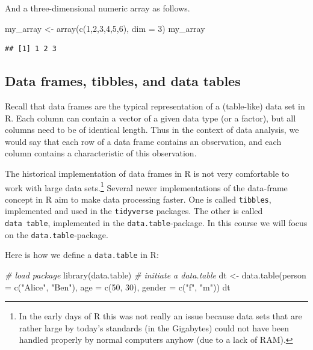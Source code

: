 \documentclass[
  12pt,
]{style/krantz}
\newenvironment{Shaded}{\begin{snugshade}}{\end{snugshade}}
\newcommand{\AttributeTok}[1]{\textcolor[rgb]{0.77,0.63,0.00}{#1}}
\newcommand{\CommentTok}[1]{\textcolor[rgb]{0.56,0.35,0.01}{\textit{#1}}}
\newcommand{\DecValTok}[1]{\textcolor[rgb]{0.00,0.00,0.81}{#1}}
\newcommand{\FunctionTok}[1]{\textcolor[rgb]{0.00,0.00,0.00}{#1}}
\newcommand{\NormalTok}[1]{#1}
\newcommand{\OtherTok}[1]{\textcolor[rgb]{0.56,0.35,0.01}{#1}}
\newcommand{\StringTok}[1]{\textcolor[rgb]{0.31,0.60,0.02}{#1}}
\begin{document}
And a three-dimensional numeric array as follows.

\begin{Shaded}
\begin{Highlighting}[]
\NormalTok{my\_array }\OtherTok{\textless{}{-}} \FunctionTok{array}\NormalTok{(}\FunctionTok{c}\NormalTok{(}\DecValTok{1}\NormalTok{,}\DecValTok{2}\NormalTok{,}\DecValTok{3}\NormalTok{,}\DecValTok{4}\NormalTok{,}\DecValTok{5}\NormalTok{,}\DecValTok{6}\NormalTok{), }\AttributeTok{dim =} \DecValTok{3}\NormalTok{)}
\NormalTok{my\_array}
\end{Highlighting}
\end{Shaded}

\begin{verbatim}
## [1] 1 2 3
\end{verbatim}

\hypertarget{data-frames-tibbles-and-data-tables}{%
\subsection{Data frames, tibbles, and data tables}\label{data-frames-tibbles-and-data-tables}}

Recall that data frames are the typical representation of a (table-like) data set in R. Each column can contain a vector of a given data type (or a factor), but all columns need to be of identical length. Thus in the context of data analysis, we would say that each row of a data frame contains an observation, and each column contains a characteristic of this observation.

The historical implementation of data frames in R is not very comfortable to work with large data sets.\footnote{In the early days of R this was not really an issue because data sets that are rather large by today's standards (in the Gigabytes) could not have been handled properly by normal computers anyhow (due to a lack of RAM).} Several newer implementations of the data-frame concept in R aim to make data processing faster. One is called \texttt{tibbles}, implemented and used in the \texttt{tidyverse} packages. The other is called \texttt{data\ table}, implemented in the \texttt{data.table}-package. In this course we will focus on the \texttt{data.table}-package.

Here is how we define a \texttt{data.table} in R:

\begin{Shaded}
\begin{Highlighting}[]
\CommentTok{\# load package}
\FunctionTok{library}\NormalTok{(data.table)}
\CommentTok{\# initiate a data.table}
\NormalTok{dt }\OtherTok{\textless{}{-}} \FunctionTok{data.table}\NormalTok{(}\AttributeTok{person =} \FunctionTok{c}\NormalTok{(}\StringTok{"Alice"}\NormalTok{, }\StringTok{"Ben"}\NormalTok{),}
                 \AttributeTok{age =} \FunctionTok{c}\NormalTok{(}\DecValTok{50}\NormalTok{, }\DecValTok{30}\NormalTok{),}
                 \AttributeTok{gender =} \FunctionTok{c}\NormalTok{(}\StringTok{"f"}\NormalTok{, }\StringTok{"m"}\NormalTok{))}
\NormalTok{dt}
\end{Highlighting}
\end{Shaded}
\end{document}
